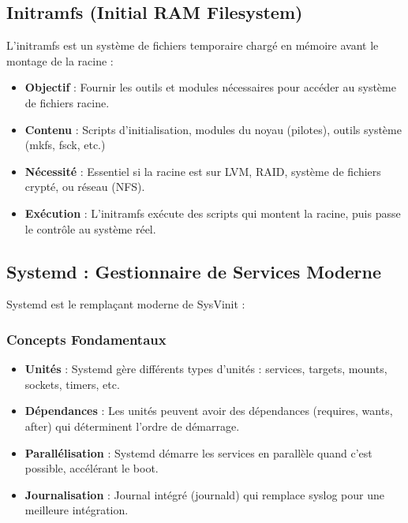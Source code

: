 \documentclass[12pt,a4paper]{article}
\begin{document}
\subsection{Initramfs (Initial RAM Filesystem)}

L'initramfs est un système de fichiers temporaire chargé en mémoire avant le montage de la racine :

\begin{itemize}
    \item \textbf{Objectif} : Fournir les outils et modules nécessaires pour accéder au système de fichiers racine.
    
    \item \textbf{Contenu} : Scripts d'initialisation, modules du noyau (pilotes), outils système (mkfs, fsck, etc.)
    
    \item \textbf{Nécessité} : Essentiel si la racine est sur LVM, RAID, système de fichiers crypté, ou réseau (NFS).
    
    \item \textbf{Exécution} : L'initramfs exécute des scripts qui montent la racine, puis passe le contrôle au système réel.
\end{itemize}

\subsection{Systemd : Gestionnaire de Services Moderne}

Systemd est le remplaçant moderne de SysVinit :

\subsubsection{Concepts Fondamentaux}

\begin{itemize}
    \item \textbf{Unités} : Systemd gère différents types d'unités : services, targets, mounts, sockets, timers, etc.
    
    \item \textbf{Dépendances} : Les unités peuvent avoir des dépendances (requires, wants, after) qui déterminent l'ordre de démarrage.
    
    \item \textbf{Parallélisation} : Systemd démarre les services en parallèle quand c'est possible, accélérant le boot.
    
    \item \textbf{Journalisation} : Journal intégré (journald) qui remplace syslog pour une meilleure intégration.
\end{itemize}
\end{document}

